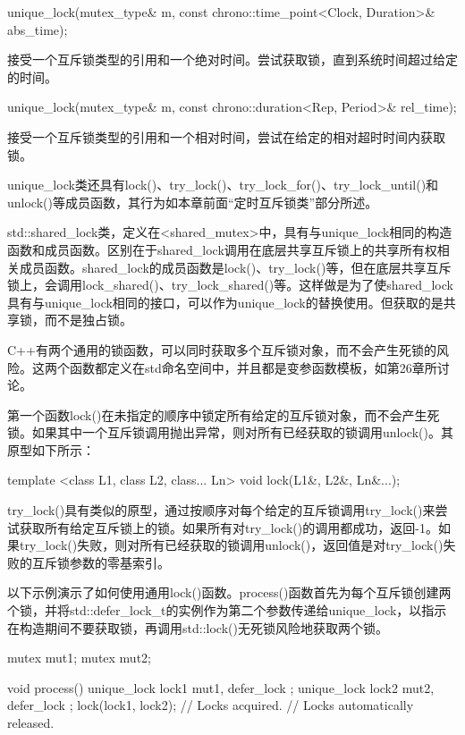 \begin{cpp}
unique_lock(mutex_type& m, const chrono::time_point<Clock, Duration>& abs_time);
\end{cpp}

接受一个互斥锁类型的引用和一个绝对时间。尝试获取锁，直到系统时间超过给定的时间。

\begin{cpp}
unique_lock(mutex_type& m, const chrono::duration<Rep, Period>& rel_time);
\end{cpp}

接受一个互斥锁类型的引用和一个相对时间，尝试在给定的相对超时时间内获取锁。

unique\_lock类还具有lock()、try\_lock()、try\_lock\_for()、try\_lock\_until()和unlock()等成员函数，其行为如本章前面“定时互斥锁类”部分所述。


std::shared\_lock类，定义在<shared\_mutex>中，具有与unique\_lock相同的构造函数和成员函数。区别在于shared\_lock调用在底层共享互斥锁上的共享所有权相关成员函数。shared\_lock的成员函数是lock()、try\_lock()等，但在底层共享互斥锁上，会调用lock\_shared()、try\_lock\_shared()等。这样做是为了使shared\_lock具有与unique\_lock相同的接口，可以作为unique\_lock的替换使用。但获取的是共享锁，而不是独占锁。


C++有两个通用的锁函数，可以同时获取多个互斥锁对象，而不会产生死锁的风险。这两个函数都定义在std命名空间中，并且都是变参函数模板，如第26章所讨论。

第一个函数lock()在未指定的顺序中锁定所有给定的互斥锁对象，而不会产生死锁。如果其中一个互斥锁调用抛出异常，则对所有已经获取的锁调用unlock()。其原型如下所示：

\begin{cpp}
template <class L1, class L2, class... Ln> void lock(L1&, L2&, Ln&...);
\end{cpp}

try\_lock()具有类似的原型，通过按顺序对每个给定的互斥锁调用try\_lock()来尝试获取所有给定互斥锁上的锁。如果所有对try\_lock()的调用都成功，返回-1。如果try\_lock()失败，则对所有已经获取的锁调用unlock()，返回值是对try\_lock()失败的互斥锁参数的零基索引。

以下示例演示了如何使用通用lock()函数。process()函数首先为每个互斥锁创建两个锁，并将std::defer\_lock\_t的实例作为第二个参数传递给unique\_lock，以指示在构造期间不要获取锁，再调用std::lock()无死锁风险地获取两个锁。

\begin{cpp}
mutex mut1;
mutex mut2;

void process()
{
    unique_lock lock1 { mut1, defer_lock };
    unique_lock lock2 { mut2, defer_lock };
    lock(lock1, lock2);
    // Locks acquired.
} // Locks automatically released.
\end{cpp}

